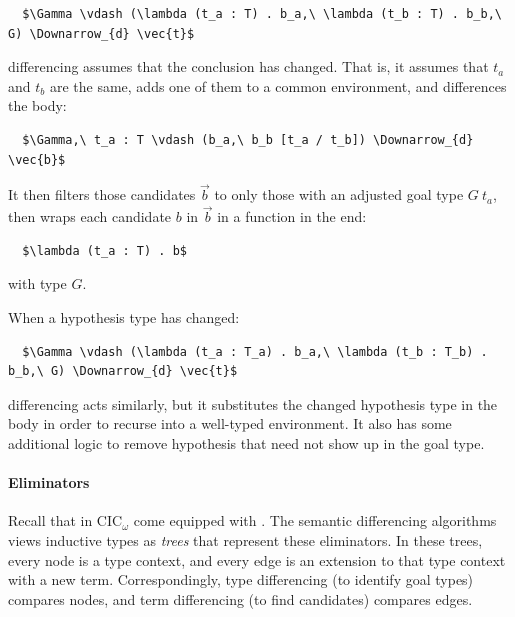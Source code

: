\begin{lstlisting}
  $\Gamma \vdash (\lambda (t_a : T) . b_a,\ \lambda (t_b : T) . b_b,\ G) \Downarrow_{d} \vec{t}$
\end{lstlisting}
differencing assumes that the conclusion has changed.
That is, it assumes that $t_a$ and $t_b$ are the same, adds one of them to a common environment,
and differences the body:

\begin{lstlisting}
  $\Gamma,\ t_a : T \vdash (b_a,\ b_b [t_a / t_b]) \Downarrow_{d} \vec{b}$
\end{lstlisting}
It then filters those candidates $\vec{b}$ to only those with an adjusted goal type $G\ t_a$,
then wraps each candidate $b$ in $\vec{b}$ in a function in the end:

\begin{lstlisting}
  $\lambda (t_a : T) . b$
\end{lstlisting}
with type $G$.

When a hypothesis type has changed:

\begin{lstlisting}
  $\Gamma \vdash (\lambda (t_a : T_a) . b_a,\ \lambda (t_b : T_b) . b_b,\ G) \Downarrow_{d} \vec{t}$
\end{lstlisting}
differencing acts similarly, but it substitutes the changed hypothesis type in the body in order to recurse into a well-typed environment.
It also has some additional logic to remove hypothesis that need not show up in the goal type.

\paragraph{Eliminators} %
Recall that  in CIC$_{\omega}$ come equipped with .
The semantic differencing algorithms views inductive types as \emph{trees} that represent these eliminators.
In these trees, every node is a type context, and every edge is an extension to that type context 
with a new term. %
Correspondingly, type differencing (to identify goal types) compares nodes, 
and term differencing (to find candidates) compares edges. 

